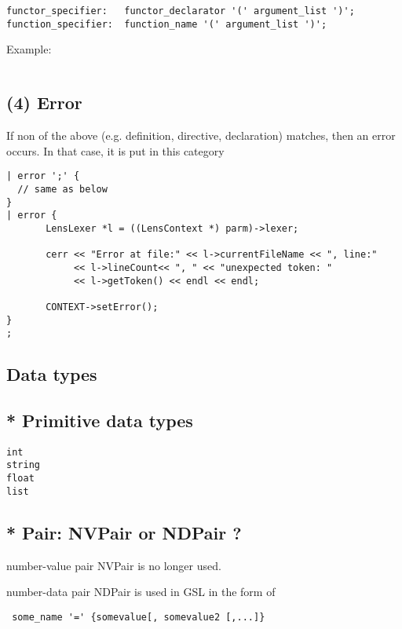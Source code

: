 \begin{verbatim}
functor_specifier:   functor_declarator '(' argument_list ')';
function_specifier:  function_name '(' argument_list ')';
\end{verbatim}

Example:
\begin{verbatim}

\end{verbatim}


\subsection{(4) Error}
\label{sec:gsl-error-section}

If non of the above (e.g. definition, directive, declaration) matches, then an error occurs.
In that case, it is put in this category
\begin{verbatim}
| error ';' {
  // same as below
}
| error {
       LensLexer *l = ((LensContext *) parm)->lexer;

       cerr << "Error at file:" << l->currentFileName << ", line:"
            << l->lineCount<< ", " << "unexpected token: "
            << l->getToken() << endl << endl;

       CONTEXT->setError();
}
;
\end{verbatim}

\subsection{Data types}
\subsection{ * Primitive data types}

\begin{verbatim}
int
string
float
list
\end{verbatim}

\subsection{* Pair: NVPair or NDPair ?}
\label{sec:NDPair}

number-value pair NVPair is no longer used.


number-data pair NDPair is used in GSL in the form of 
\begin{verbatim}
 some_name '=' {somevalue[, somevalue2 [,...]}
\end{verbatim}

